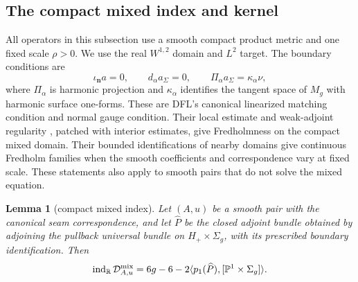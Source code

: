 \documentclass[11pt]{amsart}
\newtheorem{lemma}[theorem]{Lemma}
\theoremstyle{definition}
\theoremstyle{remark}
\theoremstyle{plain}
\newcommand{\RR}{\mathbb{R}}
\newcommand{\PP}{\mathbb{P}}
\newcommand{\cD}{\mathcal{D}}
\newcommand{\ind}{\operatorname{ind}}
\begin{document}
\subsection{The compact mixed index and kernel}\label{sec:fredholm-reduction}
All operators in this subsection use a smooth compact product metric and
one fixed scale $\rho>0$. We use the real $W^{1,2}$ domain and $L^2$
target. The boundary conditions are
\begin{equation}\label{eq:compact-mixed-domain}
 \iota_{\mathbf n}a=0,\qquad d_\alpha a_\Sigma=0,
 \qquad \Pi_\alpha a_\Sigma=\kappa_\alpha\nu,
\end{equation}
where $\Pi_\alpha$ is harmonic projection and $\kappa_\alpha$ identifies
the tangent space of $M_g$ with harmonic surface one-forms. These are
DFL's canonical linearized matching condition and normal gauge condition.
Their local estimate and weak-adjoint regularity
\cite[Theorem~5.9]{DaeFukLip21b}, patched with interior estimates, give
Fredholmness on the compact mixed domain. Their bounded identifications
of nearby domains \cite[Proposition~5.27]{DaeFukLip21b} give continuous
Fredholm families when the smooth coefficients and correspondence vary
at fixed scale. These statements also apply to smooth pairs that do not
solve the mixed equation.

\begin{lemma}[compact mixed index]\label{lem:compact-mixed-index}
Let $(A,u)$ be a smooth pair with the canonical seam correspondence,
and let $\widehat P$ be the closed adjoint bundle obtained by adjoining
the pullback universal bundle on $H_+\times\Sigma_g$, with its prescribed
boundary identification. Then
\begin{equation}\label{eq:compact-mixed-index}
 \ind_\RR\cD^{\rm mix}_{A,u}
 =6g-6-2\langle p_1(\widehat P),[\PP^1\times\Sigma_g]\rangle.
\end{equation}
\end{lemma}
\end{document}
